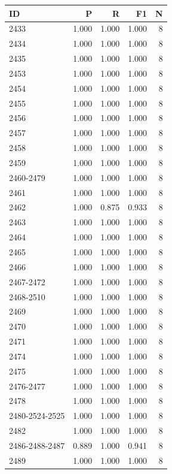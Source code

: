 \begin{tabular}{lrrrr}\toprule ID & P & R & F1 & N \\\midrule
2433 & 1.000 & 1.000 & 1.000 & 8 \\
2434 & 1.000 & 1.000 & 1.000 & 8 \\
2435 & 1.000 & 1.000 & 1.000 & 8 \\
2453 & 1.000 & 1.000 & 1.000 & 8 \\
2454 & 1.000 & 1.000 & 1.000 & 8 \\
2455 & 1.000 & 1.000 & 1.000 & 8 \\
2456 & 1.000 & 1.000 & 1.000 & 8 \\
2457 & 1.000 & 1.000 & 1.000 & 8 \\
2458 & 1.000 & 1.000 & 1.000 & 8 \\
2459 & 1.000 & 1.000 & 1.000 & 8 \\
2460-2479 & 1.000 & 1.000 & 1.000 & 8 \\
2461 & 1.000 & 1.000 & 1.000 & 8 \\
2462 & 1.000 & 0.875 & 0.933 & 8 \\
2463 & 1.000 & 1.000 & 1.000 & 8 \\
2464 & 1.000 & 1.000 & 1.000 & 8 \\
2465 & 1.000 & 1.000 & 1.000 & 8 \\
2466 & 1.000 & 1.000 & 1.000 & 8 \\
2467-2472 & 1.000 & 1.000 & 1.000 & 8 \\
2468-2510 & 1.000 & 1.000 & 1.000 & 8 \\
2469 & 1.000 & 1.000 & 1.000 & 8 \\
2470 & 1.000 & 1.000 & 1.000 & 8 \\
2471 & 1.000 & 1.000 & 1.000 & 8 \\
2474 & 1.000 & 1.000 & 1.000 & 8 \\
2475 & 1.000 & 1.000 & 1.000 & 8 \\
2476-2477 & 1.000 & 1.000 & 1.000 & 8 \\
2478 & 1.000 & 1.000 & 1.000 & 8 \\
2480-2524-2525 & 1.000 & 1.000 & 1.000 & 8 \\
2482 & 1.000 & 1.000 & 1.000 & 8 \\
2486-2488-2487 & 0.889 & 1.000 & 0.941 & 8 \\
2489 & 1.000 & 1.000 & 1.000 & 8 \\
\bottomrule\end{tabular}